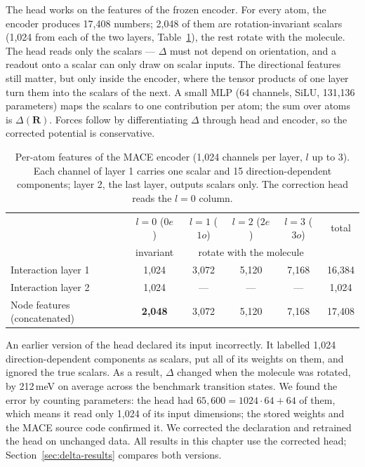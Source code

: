 The head works on the features of the frozen encoder. For every atom, the
encoder produces 17{,}408 numbers; 2{,}048 of them are rotation-invariant
scalars (1{,}024 from each of the two layers, Table~\ref{tab:mace-features}),
the rest rotate with the molecule. The head reads only the scalars ---
$\Delta$ must not depend on orientation, and a readout onto a scalar can only
draw on scalar inputs. The directional features still matter, but only inside
the encoder, where the tensor products of one layer turn them into the
scalars of the next. A small MLP (64 channels, SiLU, 131{,}136 parameters)
maps the scalars to one contribution per atom; the sum over atoms is
$\Delta(\mathbf{R})$. Forces follow by differentiating $\Delta$ through head
and encoder, so the corrected potential is conservative.



\begin{table}[htbp]
  \centering
  \caption{Per-atom features of the MACE encoder (1{,}024 channels per layer,
  $l$ up to 3). Each channel of layer 1 carries one scalar and 15
  direction-dependent components; layer 2, the last layer, outputs scalars
  only. The correction head reads the $l=0$ column.}
  \label{tab:mace-features}
  \begin{tabular}{lccccc}
    \toprule
    & $l=0$ ($0e$) & $l=1$ ($1o$) & $l=2$ ($2e$) & $l=3$ ($3o$) & total \\
    & invariant & \multicolumn{3}{c}{rotate with the molecule} & \\
    \midrule
    Interaction layer 1 & 1{,}024 & 3{,}072 & 5{,}120 & 7{,}168 & 16{,}384 \\
    Interaction layer 2 & 1{,}024 & --- & --- & --- & 1{,}024 \\
    \midrule
    Node features (concatenated) & \textbf{2{,}048} & 3{,}072 & 5{,}120 & 7{,}168 & 17{,}408 \\
    \bottomrule
  \end{tabular}
\end{table}

An earlier version of the head declared its input incorrectly. It labelled
1{,}024 direction-dependent components as scalars, put all of its weights on
them, and ignored the true scalars. As a result, $\Delta$ changed when the
molecule was rotated, by 212\,meV on average across the benchmark transition
states. We found the error by counting parameters: the head had
$65{,}600 = 1024 \cdot 64 + 64$ of them, which means it read only 1{,}024 of
its input dimensions; the stored weights and the MACE source code confirmed
it. We corrected the declaration and retrained the head on unchanged data.
All results in this chapter use the corrected head;
Section~\ref{sec:delta-results} compares both versions.


